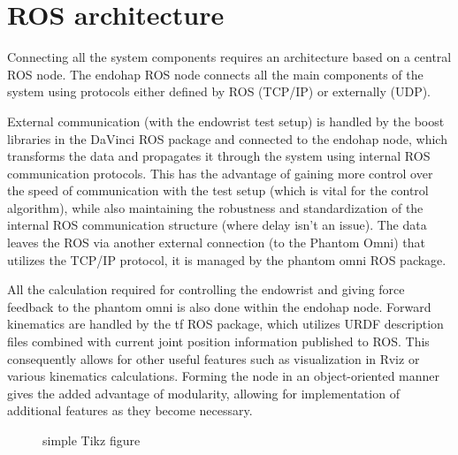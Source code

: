 \section{ROS architecture}
Connecting all the system components requires an architecture based on a central ROS node.
The endohap ROS node connects all the main components of the system using protocols either defined by ROS (TCP/IP) or externally (UDP).

External communication (with the endowrist test setup) is handled by the boost libraries in the DaVinci ROS package and connected to the endohap node, which transforms the data and propagates it through the system using internal ROS communication protocols. 
This has the advantage of gaining more control over the speed of communication with the test setup (which is vital for the control algorithm), while also maintaining the robustness and standardization of the internal ROS communication structure (where delay isn't an issue). The data leaves the ROS via another external connection (to the Phantom Omni) that utilizes the TCP/IP protocol, it is managed by the phantom omni ROS package.

All the calculation required for controlling the endowrist and giving force feedback to the phantom omni is also done within the endohap node. Forward kinematics are handled by the tf ROS package, which utilizes URDF description files combined with current joint position information published to ROS.
This consequently allows for other useful features such as visualization in Rviz or various kinematics calculations.
Forming the node in an object-oriented manner gives the added advantage of modularity, allowing for implementation of additional features as they become necessary. 

\begin{figure}[H]
\centering
{}%
\caption{simple Tikz figure}
\end{figure}

